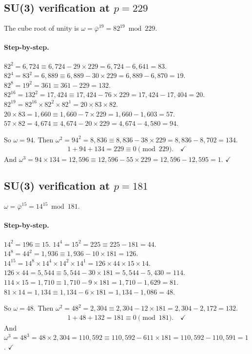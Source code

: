 \subsection{SU(3) verification at $p = 229$}

The cube root of unity is $\omega = \bar\varphi^{19} = 82^{19} \bmod 229$.

\paragraph{Step-by-step.}
$82^2 = 6{,}724 \equiv 6{,}724 - 29 \times 229 = 6{,}724 - 6{,}641 = 83$.
$82^4 = 83^2 = 6{,}889 \equiv 6{,}889 - 30 \times 229 = 6{,}889 - 6{,}870 = 19$.
$82^8 = 19^2 = 361 \equiv 361 - 229 = 132$.
$82^{16} = 132^2 = 17{,}424 \equiv 17{,}424 - 76 \times 229 = 17{,}424 - 17{,}404 = 20$.
$82^{19} = 82^{16} \times 82^2 \times 82^1 = 20 \times 83 \times 82$.
$20 \times 83 = 1{,}660 \equiv 1{,}660 - 7 \times 229 = 1{,}660 - 1{,}603 = 57$.
$57 \times 82 = 4{,}674 \equiv 4{,}674 - 20 \times 229 = 4{,}674 - 4{,}580 = 94$.

So $\omega = 94$. Then $\omega^2 = 94^2 = 8{,}836 \equiv 8{,}836 - 38 \times 229
= 8{,}836 - 8{,}702 = 134$.
\begin{align}
  1 + 94 + 134 = 229 \equiv 0 \pmod{229}. \quad\checkmark
\end{align}
And $\omega^3 = 94 \times 134 = 12{,}596 \equiv 12{,}596 - 55 \times 229
= 12{,}596 - 12{,}595 = 1$. $\checkmark$

\subsection{SU(3) verification at $p = 181$}

$\omega = \bar\varphi^{15} = 14^{15} \bmod 181$.

\paragraph{Step-by-step.}
$14^2 = 196 \equiv 15$.
$14^4 = 15^2 = 225 \equiv 225 - 181 = 44$.
$14^8 = 44^2 = 1{,}936 \equiv 1{,}936 - 10 \times 181 = 126$.
$14^{15} = 14^8 \times 14^4 \times 14^2 \times 14^1 = 126 \times 44 \times 15 \times 14$.
$126 \times 44 = 5{,}544 \equiv 5{,}544 - 30 \times 181 = 5{,}544 - 5{,}430 = 114$.
$114 \times 15 = 1{,}710 \equiv 1{,}710 - 9 \times 181 = 1{,}710 - 1{,}629 = 81$.
$81 \times 14 = 1{,}134 \equiv 1{,}134 - 6 \times 181 = 1{,}134 - 1{,}086 = 48$.

So $\omega = 48$. Then $\omega^2 = 48^2 = 2{,}304 \equiv 2{,}304 - 12 \times 181
= 2{,}304 - 2{,}172 = 132$.
\begin{align}
  1 + 48 + 132 = 181 \equiv 0 \pmod{181}. \quad\checkmark
\end{align}
And $\omega^3 = 48^3 = 48 \times 2{,}304 = 110{,}592 \equiv
110{,}592 - 611 \times 181 = 110{,}592 - 110{,}591 = 1$. $\checkmark$

